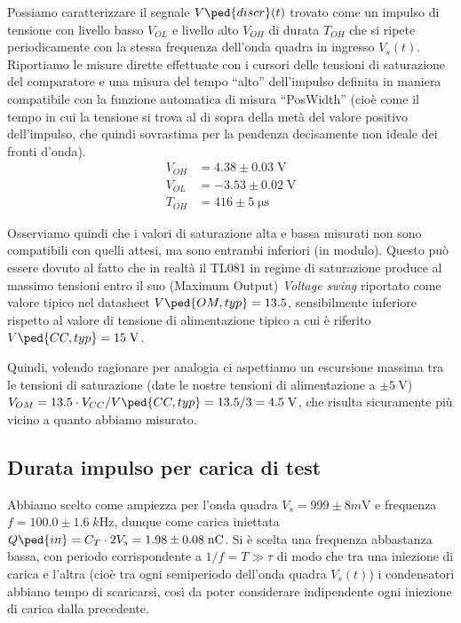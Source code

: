 \documentclass[10pt,a4paper]{article}
\begin{document}
Possiamo caratterizzare il segnale $V\ped{discr} (t)$ trovato come un impulso
di tensione con livello basso $V_{OL}$ e livello alto $V_{OH}$ di durata
$T_{OH}$ che si ripete periodicamente con la stessa frequenza dell'onda quadra
in ingresso $V_s (t)$.
Riportiamo le misure dirette effettuate con i cursori
delle tensioni di saturazione del comparatore e una misura del tempo ``alto''
dell'impulso definita in maniera compatibile con la funzione automatica di
misura ``PosWidth'' (cioè come il tempo in cui la tensione si trova al di
sopra della metà del valore positivo dell'impulso, che quindi sovrastima
per la pendenza decisamente non ideale dei fronti d'onda).
\begin{align*}
V_{OH} &= 4.38 \pm 0.03 \; \si{\V} \\
V_{OL} &= -3.53 \pm 0.02 \; \si{\V} \\
T_{OH} &= 416 \pm 5 \; \si{\micro\s}
\end{align*}

Osserviamo quindi che i valori di saturazione alta e bassa misurati non sono
compatibili con quelli attesi, ma sono entrambi inferiori (in modulo). Questo
può essere dovuto al fatto che in realtà il TL081 in regime di saturazione
produce al massimo tensioni entro il suo (Maximum Output) \emph{Voltage swing}
riportato come valore tipico nel datasheet $V\ped{OM, typ} = 13.5$,
sensibilmente inferiore rispetto al valore di tensione di alimentazione tipico
a cui è riferito $V\ped{CC, typ} = 15 \; \si{\V}$.

Quindi, volendo ragionare per analogia ci aspettiamo un escursione massima tra
le tensioni di saturazione (date le nostre tensioni di alimentazione a
$\pm \SI{5}{\V}$) $V_{OM} = 13.5 \cdot V_{CC} / V\ped{CC, typ} =
13.5 /3 = 4.5 \; \si{\V}$, che risulta sicuramente più vicino a quanto
abbiamo misurato.

\subsection{Durata impulso per carica di test}
Abbiamo scelto come ampiezza per l'onda quadra $V_s = 999 \pm 8 \si{m\V}$ e
frequenza $f = 100.0 \pm 1.6 \; \si{k\Hz}$, dunque come carica
iniettata $Q\ped{in} = C_T \cdot 2 V_s = 1.98 \pm 0.08 \; \si{n\coulomb}$.
Si è scelta una frequenza abbastanza bassa, con periodo corrispondente a
$1/f = T \gg \tau$ di modo che tra una iniezione di carica e l'altra (cioè tra
ogni semiperiodo dell'onda quadra $V_s (t)$) i condensatori abbiano tempo di
scaricarsi, così da poter considerare indipendente ogni iniezione di carica
dalla precedente.
\end{document}
